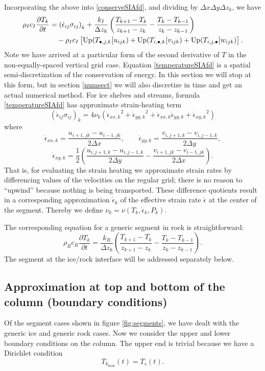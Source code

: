 \documentclass[12pt,final]{amsart}%
\theoremstyle{plain}
\theoremstyle{definition}
\theoremstyle{remark}
\newcommand{\ddt}[1]{\ensuremath{\frac{\partial #1}{\partial t}}}
\def\eps{\epsilon}
\newcommand{\Up}{\ensuremath{\operatorname{Up}}}
\begin{document}
Incorporating the above into \eqref{conserveSIAfd}, and dividing by $\Delta x\Delta y\Delta z_k$, we have
\begin{align}
\rho_I c_I \ddt{T_k} &= \left(\dot\eps_{ij} \sigma_{ij}\right)_k + \frac{k_I}{\Delta z_k} \left(\frac{T_{k+1}-T_k}{z_{k+1}-z_k} - \frac{T_k-T_{k-1}}{z_k-z_{k-1}}\right) \label{temperatureSIAfd}\\
    &\quad - \rho_I c_I \left[\Up(T_{\bullet,j,k} \big|u_{ijk}) + \Up(T_{i,\bullet,k} \big|v_{ijk}) + \Up(T_{i,j,\bullet} \big|w_{ijk})\right]. \notag
\end{align}
Note we have arrived at a particular form of the second derivative of $T$ in the non-equally-spaced vertical grid case.  Equation \eqref{temperatureSIAfd} is a spatial semi-discretization of the conservation of energy.  In this section we will stop at this form, but in section \ref{numsect} we will also discretize in time and get an actual numerical method.  For ice shelves and streams, formula \eqref{temperatureSIAfd} has approximate strain-heating term
\begin{equation}\label{icestreamstrainheatrule}
\left(\dot\eps_{ij} \sigma_{ij}\right)_k = 4 \nu_k \left({\dot\eps_{xx,k}}^2 + {\dot\eps_{yy,k}}^2 + \dot\eps_{xx,k} \dot\eps_{yy,k} + {\dot\eps_{xy,k}}^2\right)
\end{equation}
where
    $$\dot\eps_{xx,k} = \frac{u_{i+1,jk} - u_{i-1,jk}}{2\Delta x}, \qquad\dot\eps_{yy,k} = \frac{v_{i,j+1,k} - v_{i,j-1,k}}{2\Delta y},$$
    $$\dot\eps_{xy,k} = \frac{1}{2}\left(\frac{u_{i,j+1,k} - u_{i,j-1,k}}{2\Delta y} - \frac{v_{i+1,jk} - v_{i-1,jk}}{2\Delta x}\right).$$
That is, for evaluating the strain heating we approximate strain rates by differencing values of the velocities on the regular grid; there is no reason to ``upwind'' because nothing is being transported.  These difference quotients result in a corresponding approximation $\dot\eps_k$ of the effective strain rate $\dot\eps$ at the center of the segment.  Thereby we define $\nu_k = \nu(T_k,\dot\eps_k,P_k)$.

The corresponding equation for a generic segment in rock is straightforward:
\begin{equation}
\rho_R c_R \ddt{T_k} = \frac{k_R}{\Delta z_k} \left(\frac{T_{k+1}-T_k}{z_{k+1}-z_k} - \frac{T_k-T_{k-1}}{z_k-z_{k-1}}\right). \label{temperatureROCKfd}
\end{equation}
The segment at the ice/rock interface will be addressed separately below.

\subsection*{Approximation at top and bottom of the column (boundary conditions)}  Of the segment cases shown in figure \ref{fig:segments}, we have dealt with the generic ice and generic rock cases.  Now we consider the upper and lower boundary conditions on the column.  The upper end is trivial because we have a Dirichlet condition
\begin{equation}\label{topDirichlet}
T_{k_{\max}}(t) = T_s(t).
\end{equation}
\end{document}
